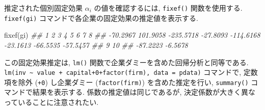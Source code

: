 \documentclass[
  letterpaper,
  xelatex,
  ja=standard, xelatex]{bxjsbook}
\newenvironment{Shaded}{\begin{snugshade}}{\end{snugshade}}
\newcommand{\DocumentationTok}[1]{\textcolor[rgb]{0.37,0.37,0.37}{\textit{#1}}}
\newcommand{\FunctionTok}[1]{\textcolor[rgb]{0.28,0.35,0.67}{#1}}
\newcommand{\NormalTok}[1]{\textcolor[rgb]{0.00,0.23,0.31}{#1}}
\begin{document}
推定された個別固定効果 \(\alpha_i\) の値を確認するには, \texttt{fixef()}
関数を使用する. \texttt{fixef(gi)}
コマンドで各企業の固定効果の推定値を表示する.

\begin{Shaded}
\begin{Highlighting}[]
\FunctionTok{fixef}\NormalTok{(gi)}
\DocumentationTok{\#\#         1         2         3         4         5         6         7         8 }
\DocumentationTok{\#\#  {-}70.2967  101.9058 {-}235.5718  {-}27.8093 {-}114.6168  {-}23.1613  {-}66.5535  {-}57.5457 }
\DocumentationTok{\#\#         9        10 }
\DocumentationTok{\#\#  {-}87.2223   {-}6.5678}
\end{Highlighting}
\end{Shaded}

この固定効果推定は, \texttt{lm()}
関数で企業ダミーを含めた回帰分析と同等である.
\texttt{lm(inv\ \textasciitilde{}\ value\ +\ capital+0+factor(firm),\ data\ =\ pdata)}
コマンドで, 定数項を除外 (\texttt{+0}) し企業ダミー
(\texttt{factor(firm)}) を含めた推定を行い, \texttt{summary()}
コマンドで結果を表示する. 係数の推定値は同じであるが,
決定係数が大きく異なっていることに注意されたい.
\end{document}
